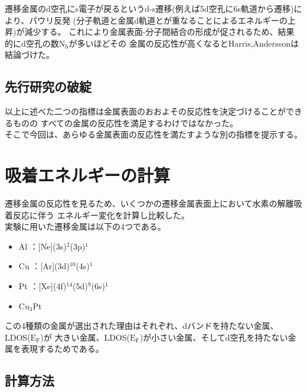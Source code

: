 \documentclass[12pt]{ltjsarticle}
\begin{document}
遷移金属のd空孔にs電子が戻るというd-s遷移(例えば5d空孔に6s軌道から遷移)により、パウリ反発
(分子軌道と金属d軌道とが重なることによるエネルギーの上昇)が減少する。\cite{MORIKAWA2006}
これにより金属表面-分子間結合の形成が促されるため、結果的にd空孔の数$\text{N}_\text{h}$が多いほどその
金属の反応性が高くなるとHarris,Anderssonは結論づけた。\cite{J.Harris1985}

\subsection{先行研究の破綻}
以上に述べた二つの指標は金属表面のおおよその反応性を決定づけることができるものの
すべての金属の反応性を満足するわけではなかった。\\
そこで今回は、あらゆる金属表面の反応性を満たすような別の指標を提示する。\cite{Science1995}

\section{吸着エネルギーの計算}
遷移金属の反応性を見るため、いくつかの遷移金属表面上において水素の解離吸着反応に伴う
エネルギー変化を計算し比較した。\\

実験に用いた遷移金属は以下の4つである。

\begin{itemize}
 \item Al ：[Ne](3s)$^\text{2}$(3p)$^\text{1}$
 \item Cu ：[Ar](3d)$^\text{10}$(4s)$^\text{1}$
 \item Pt ：[Xe](4f)$^\text{14}$(5d)$^\text{9}$(6s)$^\text{1}$
 \item $\text{Cu}_\text{3}$Pt
\end{itemize}
この4種類の金属が選出された理由はそれぞれ、dバンドを持たない金属、LDOS($\text{E}_\text{F}$)が
大きい金属、LDOS($\text{E}_\text{F}$)が小さい金属、そしてd空孔を持たない金属を表現するためである。

\subsection{計算方法}
\end{document}
